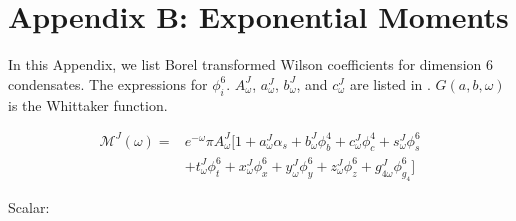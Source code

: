 \documentclass[aps,prc,superscriptaddress,showpacs,floatfix, nofootinbib,preprintnumbers,twocolumn]{revtex4}
\begin{document}
\section*{Appendix B: Exponential Moments}
In this Appendix, we list Borel transformed Wilson coefficients for dimension 6 condensates.  The expressions for $\phi^6_i$. $A^{J}_{\omega}$, $a^{J}_{\omega}$, $b^{J}_{\omega}$, and $c^{J}_{\omega}$ are listed in \cite{Bertlmann:1981he,Morita:2009qk}. $G(a,b,\omega)$ is the Whittaker function.
\begin{small}
\begin{align}
\mathcal{M}^{J}(\omega)=&e^{-\omega}\pi A^{J}_{\omega}[1+a^{J}_{\omega}\alpha_s+b^{J}_{\omega}\phi^4_b+c^{J}_{\omega}\phi^4_c+s^{J}_{\omega}\phi^6_s \nonumber\\
&+t^{J}_{\omega}\phi^6_t+x^{J}_{\omega}\phi^6_x+y^{J}_{\omega}\phi^6_y+z^{J}_{\omega}\phi^6_z+g^{J}_{4\omega}\phi^6_{g_4}]
\end{align}
\end{small}
Scalar:
\end{document}
